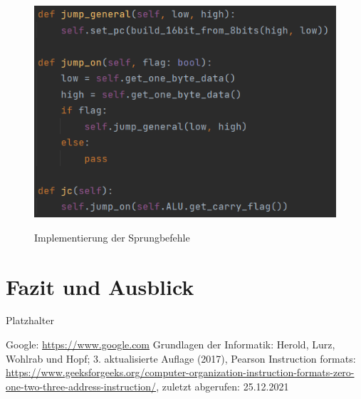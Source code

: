 \documentclass[12pt]{article}
\begin{document}
\begin{figure}[h]
\caption{Implementierung der Sprungbefehle}
\centering
\includegraphics[width=15cm]{Bilder/JumpVariants}
\label{fig:JumpVariants}
\end{figure}

\newpage

\section{Fazit und Ausblick}
Platzhalter

\newpage


\begin{thebibliography}{9}
Google: \url{https://www.google.com}
Grundlagen der Informatik: Herold, Lurz, Wohlrab und Hopf; 3. aktualisierte Auflage (2017), Pearson
Instruction formats: \url{https://www.geeksforgeeks.org/computer-organization-instruction-formats-zero-one-two-three-address-instruction/}, zuletzt abgerufen: 25.12.2021
\end{thebibliography}



%
\end{document}

